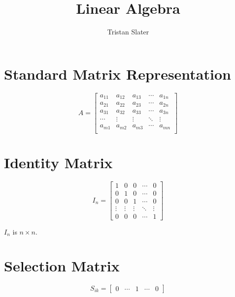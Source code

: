 \documentclass{article}
\title{Linear Algebra}
\author{Tristan Slater}
\begin{document}
    \maketitle

    \section{Standard Matrix Representation}

    \begin{equation}
        A = \begin{bmatrix}
            a_{11} & a_{12} & a_{13} & \cdots & a_{1n} \\
            a_{21} & a_{22} & a_{23} & \cdots & a_{2n} \\
            a_{31} & a_{32} & a_{33} & \cdots & a_{3n} \\
            \cdots & \vdots & \vdots & \ddots & \vdots \\
            a_{m1} & a_{m2} & a_{m3} & \cdots & a_{mn} \\
        \end{bmatrix}
    \end{equation}

    \section{Identity Matrix}

    \begin{equation}
        I_n = \begin{bmatrix}
            1 & 0 & 0 & \cdots & 0 \\
            0 & 1 & 0 & \cdots & 0 \\
            0 & 0 & 1 & \cdots & 0 \\
            \vdots & \vdots & \vdots & \ddots & \vdots \\
            0 & 0 & 0 & \cdots & 1
        \end{bmatrix}
    \end{equation}

    $I_n$ is $n \times n$.

    \section{Selection Matrix}

    \begin{equation}
        S_{ik} = \begin{bmatrix}
            0 & \cdots & 1 & \cdots & 0
        \end{bmatrix}
    \end{equation}
\end{document}
